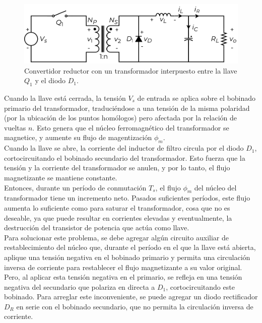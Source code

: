 \begin{figure}[H]
    \centering
    \includegraphics[scale=0.6]{Imagenes/Desarrollo Forward 1.pdf}
    \caption{Convertidor reductor con un transformador interpuesto entre la llave $Q_1$ y el diodo $D_1$.}
    \label{desarrollo_forward}
\end{figure}

Cuando la llave está cerrada, la tensión $V_s$ de entrada se aplica sobre el bobinado primario del transformador, traduciéndose a una tensión de la misma polaridad (por la ubicación de los puntos homólogos) pero afectada por la relación de vueltas $n$. Esto genera que el núcleo ferromagnético del transformador se magnetice, y aumente su flujo de magentización $\phi_m$.\\

Cuando la llave se abre, la corriente del inductor de filtro circula por el diodo $D_1$, cortocircuitando el bobinado secundario del transformador. Esto fuerza que la tensión y la corriente del transformador se anulen, y por lo tanto, el flujo magnetizante se mantiene constante.\\

Entonces, durante un período de conmutación $T_s$, el flujo $\phi_m$ del núcleo del transformador tiene un incremento neto. Pasados suficientes períodos, este flujo aumenta lo suficiente como para saturar el transformador, cosa que no es deseable, ya que puede resultar en corrientes elevadas y eventualmente, la destrucción del transistor de potencia que actúa como llave.\\

Para solucionar este problema, se debe agregar algún circuito auxiliar de restablecimiento del núcleo que, durante el período en el que la llave está abierta, aplique una tensión negativa en el bobinado primario y permita una circulación inversa de corriente para restablecer el flujo magnetizante a su valor original.\\

Pero, al aplicar esta tensión negativa en el primario, se refleja en una tensión negativa del secundario que polariza en directa a $D_1$, cortocircuitando este bobinado. Para arreglar este inconveniente, se puede agregar un diodo rectificador $D_R$ en serie con el bobinado secundario, que no permita la circulación inversa de corriente.\\

